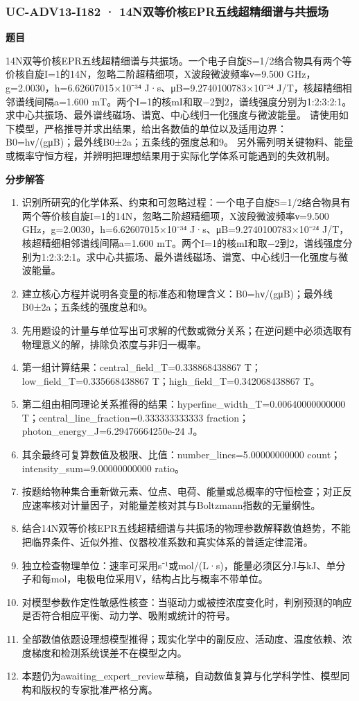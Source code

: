 \documentclass[UTF8,11pt,a4paper]{ctexart}
\begin{document}
\subsubsection*{UC-ADV13-I182 · 14N双等价核EPR五线超精细谱与共振场}
\noindent\textbf{题目}\par
14N双等价核EPR五线超精细谱与共振场。一个电子自旋S=1/2络合物具有两个等价核自旋I=1的14N，忽略二阶超精细项，X波段微波频率ν=9.500 GHz，g=2.0030，h=6.62607015×10⁻³⁴ J·s、μB=9.2740100783×10⁻²⁴ J/T，核超精细相邻谱线间隔a=1.600 mT。两个I=1的核mI和取−2到2，谱线强度分别为1:2:3:2:1。求中心共振场、最外谱线磁场、谱宽、中心线归一化强度与微波能量。 请使用如下模型，严格推导并求出结果，给出各数值的单位以及适用边界：B0=hν/(gμB)；最外线B0±2a；五条线的强度总和9。 另外需列明关键物料、能量或概率守恒方程，并辨明把理想结果用于实际化学体系可能遇到的失效机制。\par
\medskip\noindent\textbf{分步解答}
\begin{enumerate}
\item 识别所研究的化学体系、约束和可忽略过程：一个电子自旋S=1/2络合物具有两个等价核自旋I=1的14N，忽略二阶超精细项，X波段微波频率ν=9.500 GHz，g=2.0030，h=6.62607015×10⁻³⁴ J·s、μB=9.2740100783×10⁻²⁴ J/T，核超精细相邻谱线间隔a=1.600 mT。两个I=1的核mI和取−2到2，谱线强度分别为1:2:3:2:1。求中心共振场、最外谱线磁场、谱宽、中心线归一化强度与微波能量。
\item 建立核心方程并说明各变量的标准态和物理含义：B0=hν/(gμB)；最外线B0±2a；五条线的强度总和9。
\item 先用题设的计量与单位写出可求解的代数或微分关系；在逆问题中必须选取有物理意义的解，排除负浓度与非归一概率。
\item 第一组计算结果：central\_field\_T=0.338868438867 T；low\_field\_T=0.335668438867 T；high\_field\_T=0.342068438867 T。
\item 第二组由相同理论关系推得的结果：hyperfine\_width\_T=0.00640000000000 T；central\_line\_fraction=0.333333333333 fraction；photon\_energy\_J=6.29476664250e-24 J。
\item 其余最终可复算数值及极限、比值：number\_lines=5.00000000000 count；intensity\_sum=9.00000000000 ratio。
\item 按题给物种集合重新做元素、位点、电荷、能量或总概率的守恒检查；对正反应速率核对计量因子，对能量差核对其与Boltzmann指数的无量纲性。
\item 结合14N双等价核EPR五线超精细谱与共振场的物理参数解释数值趋势，不能把临界条件、近似外推、仪器校准系数和真实体系的普适定律混淆。
\item 独立检查物理单位：速率可采用s⁻¹或mol/(L·s)，能量必须区分J与kJ、单分子和每mol，电极电位采用V，结构占比与概率不带单位。
\item 对模型参数作定性敏感性核查：当驱动力或被控浓度变化时，判别预测的响应是否符合相应平衡、动力学、吸附或统计的符号。
\item 全部数值依题设理想模型推得；现实化学中的副反应、活动度、温度依赖、浓度梯度和检测系统误差不在模型之内。
\item 本题仍为awaiting\_expert\_review草稿，自动数值复算与化学科学性、模型同构和版权的专家批准严格分离。
\end{enumerate}
\end{document}
